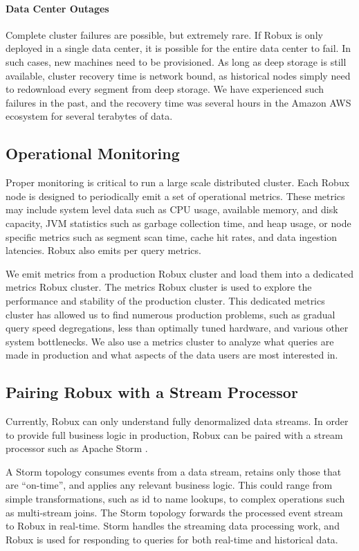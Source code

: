 \documentclass{sig-alternate-2013}
\begin{document}
\paragraph{Data Center Outages}
Complete cluster failures are possible, but extremely rare. If Robux is
only deployed in a single data center, it is possible for the entire data
center to fail. In such cases, new machines need to be provisioned. As long as
deep storage is still available, cluster recovery time is network bound, as
historical nodes simply need to redownload every segment from deep storage. We
have experienced such failures in the past, and the recovery time was
several hours in the Amazon AWS ecosystem for several terabytes of data.

\subsection{Operational Monitoring}
Proper monitoring is critical to run a large scale distributed cluster.
Each Robux node is designed to periodically emit a set of operational metrics.
These metrics may include system level data such as CPU usage, available
memory, and disk capacity, JVM statistics such as garbage collection time, and
heap usage, or node specific metrics such as segment scan time, cache
hit rates, and data ingestion latencies. Robux also emits per query metrics.

We emit metrics from a production Robux cluster and load them into a dedicated
metrics Robux cluster. The metrics Robux cluster is used to explore the
performance and stability of the production cluster. This dedicated metrics
cluster has allowed us to find numerous production problems, such as gradual
query speed degregations, less than optimally tuned hardware, and various other
system bottlenecks. We also use a metrics cluster to analyze what queries are
made in production and what aspects of the data users are most interested in.

\subsection{Pairing Robux with a Stream Processor}
Currently, Robux can only understand fully denormalized data
streams. In order to provide full business logic in production, Robux can be
paired with a stream processor such as Apache Storm \cite{marz2013storm}.

A Storm topology consumes events from a data stream, retains only those that are
“on-time”, and applies any relevant business logic. This could range from
simple transformations, such as id to name lookups, to complex operations
such as multi-stream joins. The Storm topology forwards the processed event
stream to Robux in real-time. Storm handles the streaming data processing work,
and Robux is used for responding to queries for both real-time and
historical data.
\end{document}
